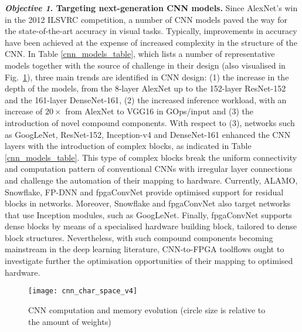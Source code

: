 \documentclass[format=acmsmall, review=false, screen=true]{acmart}
\begin{document}
\textbf{\textit{Objective 1}. Targeting next-generation CNN models.}
Since AlexNet's win in the 2012 ILSVRC competition, a number of CNN models \cite{Zeiler_2014}\cite{Simonyan14c}\cite{Szegedy2014}\cite{He_2016}\cite{Szegedy_2016}\cite{huang2017densely} paved the way for the state-of-the-art accuracy in visual tasks. Typically, improvements in accuracy have been achieved at the expense of increased complexity in the structure of the CNN. In Table \ref{cnn_models_table}, which lists a number of representative models together with the source of challenge in their design (also visualised in \mbox{Fig. \ref{fig:cnn_schar_space}}), three main trends are identified in CNN design: (1) the increase in the depth of the models, from the 8-layer AlexNet up to the 152-layer ResNet-152 {\color{black}and the 161-layer DenseNet-161}, (2) the increased inference workload, with an increase of $20 \times$ from AlexNet to VGG16 in GOps/input and (3) the introduction of novel compound components. With respect to (3), networks such as GoogLeNet, ResNet-152, Inception-v4 and {\color{black}DenseNet-161} enhanced the CNN layers with the introduction of complex blocks, as indicated in Table \ref{cnn_models_table}. This type of complex blocks break the uniform connectivity and computation pattern of conventional CNNs with irregular layer connections and challenge the automation of their mapping to hardware. {\color{black}Currently, ALAMO, Snowflake, FP-DNN and fpgaConvNet provide optimised support for residual blocks in networks. Moreover, Snowflake and fpgaConvNet also target networks that use Inception modules, such as GoogLeNet. Finally, fpgaConvNet supports dense blocks by means of a specialised hardware building block, tailored to dense block structures. Nevertheless, with such compound components becoming mainstream in the deep learning literature, CNN-to-FPGA toolflows ought to investigate further the optimisation opportunities of their mapping to optimised hardware.}

\begin{figure}[t] %
 	\vspace{-0.2cm}
	\centering
	\texttt{[image: cnn\_char\_space\_v4]}
	\vspace{-0.5cm}
	\caption{CNN computation and memory evolution (circle size is relative to the amount of weights)}
	\label{fig:cnn_schar_space}
	\vspace{-0.5cm}
\end{figure}
\end{document}
